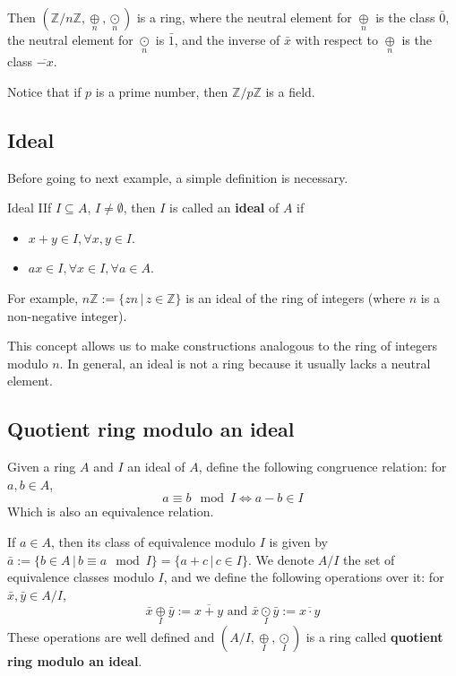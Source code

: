\documentclass[12pt,a4paper]{article}
\begin{document}
Then $(\mathbb{Z}/n \mathbb{Z}, \underset{n}{\oplus}, \underset{n}{\odot})$ is a ring, where the neutral element for $\underset{n}{\oplus}$ is the class $\bar{0}$, the neutral element for $\underset{n}{\odot}$ is $\bar{1}$, and the inverse of $\bar{x}$ with respect to $\underset{n}{\oplus}$ is the class $\overline{-x}$.

Notice that if $p$ is a prime number, then $\mathbb{Z} / p\mathbb{Z}$ is a field.

\subsection{Ideal}

Before going to next example, a simple definition is necessary.

\begin{defn}{Ideal}
IIf \(I \subseteq A\), $I \neq \emptyset$, then \(I\) is called an \textbf{ideal} of \(A\) if
\begin{itemize}
\item
  \(x+y \in I, \forall x, y \in I\).
\item
  \(ax \in I, \forall x \in I, \forall a \in A\).
\end{itemize}
\end{defn}

For example, \(n \mathbb{Z} := \{zn \, | \, z \in \mathbb{Z} \}\) is an ideal of the ring of integers (where \(n\) is a non-negative integer).

This concept allows us to make constructions analogous to the ring of integers modulo \(n\). In general, an ideal is not a ring because it usually lacks a neutral element.

\subsection{Quotient ring modulo an ideal}

Given a ring $A$ and $I$ an ideal of $A$, define the following congruence relation: for $a, b \in A$,
\[a \equiv b \mod I \iff a- b \in I  \]
Which is also an equivalence relation.

If $a \in A$, then its class of equivalence modulo $I$ is given by \(\bar{a} := \{ b \in A \, | \, b \equiv a \mod I \} = \{ a + c \, | \, c \in I \}\). We denote $A/I$ the set of equivalence classes modulo $I$, and we define the following operations over it: for $\bar{x}, \bar{y} \in A/I$, 
\[
\bar{x} \underset{I}{\oplus} \bar{y} := \overline{x+y} \text{ and } \bar{x} \underset{I}{\odot} \bar{y} := \overline{x\cdot y}
\]
These operations are well defined and $(A/I, \underset{I}{\oplus},  \underset{I}{\odot})$ is a ring called \textbf{quotient ring modulo an ideal}.
\end{document}

